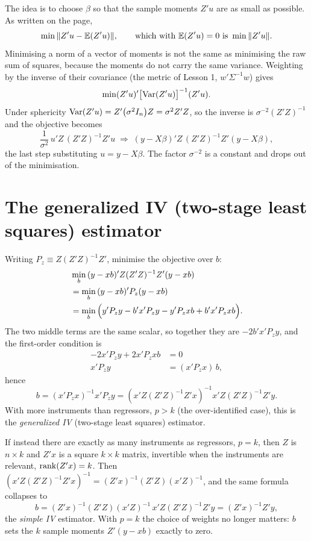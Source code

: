 \documentclass[11pt]{article}
\begin{document}
The idea is to choose $\beta$ so that the sample moments $Z'u$ are as small as
possible. As written on the page,
\[ \min \|Z'u-\mathbb{E}(Z'u)\|,\qquad\text{which with } \mathbb{E}(Z'u)=0 \text{ is } \min\|Z'u\| . \]
Minimising a norm of a vector of moments is not the same as minimising the raw sum
of squares, because the moments do not carry the same variance. Weighting by the
inverse of their covariance (the metric of Lesson 1, $w'\Sigma^{-1}w$) gives
\[ \min (Z'u)'\bigl[\operatorname{Var}(Z'u)\bigr]^{-1}(Z'u). \]
Under sphericity $\operatorname{Var}(Z'u)=Z'\bigl(\sigma^{2}I_n\bigr)Z=\sigma^{2}Z'Z$, so the
inverse is $\sigma^{-2}(Z'Z)^{-1}$ and the objective becomes
\[ \frac{1}{\sigma^{2}}\,u'Z\,(Z'Z)^{-1}Z'u
   \;\Longrightarrow\;
   (y-X\beta)'Z\,(Z'Z)^{-1}Z'(y-X\beta), \]
the last step substituting $u=y-X\beta$. The factor $\sigma^{-2}$ is a constant and
drops out of the minimisation.

\section{The generalized IV (two-stage least squares) estimator}

Writing $P_z\equiv Z(Z'Z)^{-1}Z'$, minimise the objective over $b$:
\[
\begin{aligned}
  &\min_b\,(y-xb)'Z(Z'Z)^{-1}Z'(y-xb)\\
  &=\min_b\,(y-xb)'P_z(y-xb)\\
  &=\min_b\,\Bigl(y'P_zy-b'x'P_zy-y'P_zxb+b'x'P_zxb\Bigr).
\end{aligned}
\]
The two middle terms are the same scalar, so together they are $-2b'x'P_zy$, and the
first-order condition is
\[
\begin{aligned}
  -2x'P_zy+2x'P_zxb&=0\\
  x'P_zy&=(x'P_zx)\,b,
\end{aligned}
\]
hence
\[ b=(x'P_zx)^{-1}x'P_zy
   =(x'Z(Z'Z)^{-1}Z'x)^{-1}x'Z(Z'Z)^{-1}Z'y . \]
With more instruments than regressors, $p>k$ (the over-identified case), this is
the \emph{generalized IV} (two-stage least squares) estimator.

If instead there are exactly as many instruments as regressors, $p=k$, then $Z$ is
$n\times k$ and $Z'x$ is a square $k\times k$ matrix, invertible when the
instruments are relevant, $\operatorname{rank}(Z'x)=k$. Then
$(x'Z(Z'Z)^{-1}Z'x)^{-1}=(Z'x)^{-1}(Z'Z)(x'Z)^{-1}$, and the same formula collapses
to
\[ b=(Z'x)^{-1}(Z'Z)(x'Z)^{-1}\,x'Z(Z'Z)^{-1}Z'y=(Z'x)^{-1}Z'y, \]
the \emph{simple IV} estimator. With $p=k$ the choice of weights no longer matters:
$b$ sets the $k$ sample moments $Z'(y-xb)$ exactly to zero.
\end{document}
